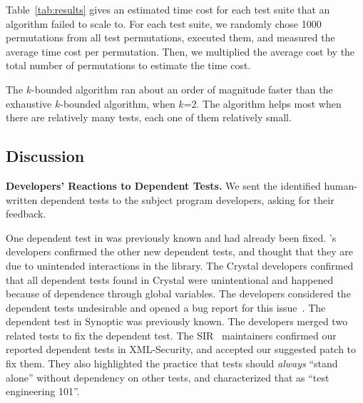 Table~\ref{tab:results} gives an estimated time cost for each
test suite that an algorithm failed to scale to. For each test suite,
we randomly chose 1000 permutations from all
test permutations, executed them, and measured the average time cost
per permutation. Then, we multiplied
the average cost by the total number of permutations to estimate
the time cost.

The \dependenceaware{} $k$-bounded algorithm ran about
an order of magnitude faster
than the exhaustive $k$-bounded algorithm,  when $k$=2.
The \dependenceaware{} algorithm helps most when there are relatively many
tests, each one of them relatively small.






\subsection{Discussion}
\label{sec:expdiscussion}


\noindent \textbf{Developers' Reactions to Dependent Tests.}
We sent the identified human-written dependent tests to the
subject program developers, asking for their feedback.

One dependent test in \jt was previously known
and had already been fixed. \jt's
developers confirmed the other new dependent
tests, and thought that they are due to unintended interactions
in the library.
%
The Crystal developers confirmed that all dependent tests
found in Crystal were unintentional and happened because of dependence
through global variables. The developers considered the
dependent tests undesirable and opened a bug report for
this issue~\cite{crystalbugreport}.
%
The dependent test in Synoptic was previously known.
The developers merged two related tests to fix
the dependent test.
%
The SIR~\cite{sir} maintainers confirmed our reported dependent
tests in XML-Security, and accepted our
suggested patch to fix them. They also highlighted the practice
that tests should \textit{always} ``stand alone''
without dependency on other tests, and characterized that as
``test engineering 101''. 


